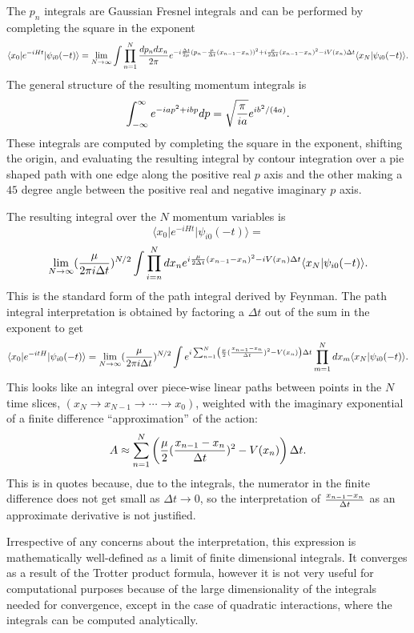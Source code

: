 \documentclass[aps,prc,reprint,noshowpacs,groupedaddress,onecolumn]{revtex4}
\def\beq{\begin{equation}}
\def\eeq{\end{equation}}
\begin{document}
The $p_n$ integrals are Gaussian Fresnel integrals and can be performed by
completing the square in the exponent
\beq
\langle x_0 \vert
e^{-iHt} \vert
\psi_{i0} (-t) \rangle =
\lim_{N\to \infty}
\int \prod_{n=1}^N {dp_n dx_n \over 2 \pi}
e^{
-i {\Delta t \over 2\mu} (p_n - {\mu \over \Delta t}(x_{n-1}-x_n))^2
+i {\mu \over 2\Delta t} (x_{n-1}-x_n)^2
-i 
V(x_n) \Delta t }
\langle x_N \vert \psi_{i0} (-t)\rangle. 
\label{fs.12}
\eeq
The general structure of the resulting momentum integrals is 
\beq
\int_{-\infty}^{\infty} e^{-i a p^2 + i bp } dp =
\sqrt{\pi \over i a} e^{i b^2/(4a) }.
\label{fs.13}
\eeq
These integrals are computed by completing the square in the exponent,
shifting the origin, and evaluating the resulting integral by contour
integration over a pie shaped path with one edge along the positive
real $p$ axis and the other making a $45$ degree angle between the positive 
real and negative imaginary $p$ axis.

The resulting integral over the $N$ momentum variables is 
\[
\langle x_0 \vert e^{-iHt}  \vert \psi_{i0} (-t) \rangle =  
\]
\beq
\lim_{N\to \infty}
({\mu \over 2 \pi i \Delta t})^{N/2}
\int \prod_{i=n}^N dx_n
e^{
i {\mu \over 2\Delta t} (x_{n-1}-x_n)^2
-i V(x_n) \Delta t }
\langle x_N \vert \psi_{i0} (-t)\rangle.  
\label{fs.14}
\eeq
This is the standard form of the path integral derived by Feynman. 
The path integral interpretation is obtained by factoring 
a $\Delta t$ out of the sum in the exponent to get
\beq
\langle x_0 \vert e^{-itH}  \vert \psi_{i0} (-t) \rangle =  
\lim_{N\to \infty}
({\mu \over 2 \pi i \Delta t})^{N/2}
\int 
e^{
i \sum_{n=1}^N \left ({\mu \over 2 } ({x_{n-1}-x_n\over \Delta t})^2
- V(x_n)\right ) \Delta t }\prod_{m=1}^N dx_m
\langle x_N \vert \psi_{i0} (-t)\rangle . 
\label{fs.15}
\eeq
This looks like an integral over piece-wise linear paths between
points in the $N$ time slices, $(x_N \to x_{N-1} \to \cdots \to x_0)$,
weighted with the imaginary exponential of a finite difference 
``approximation'' of the action:
\beq
A \approx  \sum_{n=1}^N \left ({\mu \over 2 } ({x_{n-1}-x_n\over \Delta t})^2
- V(x_n)\right ) \Delta t .
\label{fs.16}
\eeq
This is in quotes because, due to the integrals, the numerator in the
finite difference does not get small as $\Delta t \to 0$, so the
interpretation of ${x_{n-1}-x_n\over \Delta t}$
as an approximate derivative is not justified.

Irrespective of any concerns about the interpretation, this expression
is mathematically well-defined as a limit of finite dimensional
integrals.  It converges as a result of the Trotter product formula,
however it is not very useful for computational purposes because of
the large dimensionality of the integrals needed for convergence,
except in the case of quadratic interactions, where the integrals can
be computed analytically.
\end{document}
